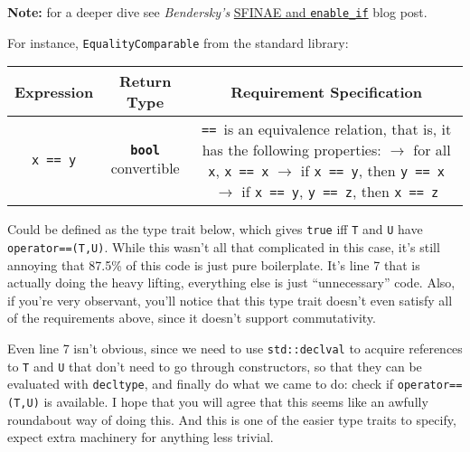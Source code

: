     \noindent \textbf{Note:} for a deeper dive see \emph{Bendersky's} \href{https://eli.thegreenplace.net/2014/sfinae-and-enable_if/}{SFINAE and \texttt{enable\_if}} blog post.

    For instance, \texttt{EqualityComparable} from the  standard library:

    \begin{table}[h]
    \begin{tabular}{ccc}
        \toprule
        \bf{Expression} & \bf{Return Type} & \bf{Requirement Specification} \\
        \midrule
        \texttt{x == y} & \textbf{\texttt{bool}} convertible & \makecell[l]{\texttt{==}\, is an equivalence relation, that is,\\
                                                                it has the following properties:\\
                                                                $\rightarrow$ for all \texttt{x}, \texttt{x == x}\\
                                                                $\rightarrow$ if \texttt{x == y}, then \texttt{y == x}\\
                                                                $\rightarrow$ if \texttt{x == y}, \texttt{y == z}, then \texttt{x == z}} \\
        \bottomrule
    \end{tabular}
    \end{table}

    \noindent Could be defined as the type trait below, which gives \texttt{true} iff \texttt{T} and \texttt{U} have \texttt{operator==(T,U)}. While this wasn't all that complicated in this case, it's still annoying that 87.5\% of this code is just pure boilerplate. It's line 7 that is actually doing the heavy lifting, everything else is just ``unnecessary'' code. Also, if you're very observant, you'll notice that this type trait doesn't even satisfy all of the requirements above, since it doesn't support commutativity.

    Even line 7 isn't obvious, since we need to use \texttt{std::declval} to acquire references to \texttt{T} and \texttt{U} that don't need to go through constructors, so that they can be evaluated with \texttt{decltype}, and finally do what we came to do: check if \texttt{operator==(T,U)} is available. I hope that you will agree that this seems like an awfully roundabout way of doing this. And this is one of the easier type traits to specify, expect extra machinery for anything less trivial.

